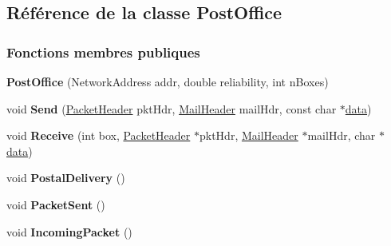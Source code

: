 \hypertarget{class_post_office}{}\subsection{Référence de la classe Post\+Office}
\label{class_post_office}
\subsubsection*{Fonctions membres publiques}
\begin{DoxyCompactItemize}
\item 
\hypertarget{class_post_office_af79d08378025395d9e5fbcb62fc508cb}{}\label{class_post_office_af79d08378025395d9e5fbcb62fc508cb} 
{\bfseries Post\+Office} (Network\+Address addr, double reliability, int n\+Boxes)
\item 
\hypertarget{class_post_office_a06fa263f4cd816e35c8aa78c5168f21f}{}\label{class_post_office_a06fa263f4cd816e35c8aa78c5168f21f} 
void {\bfseries Send} (\hyperlink{class_packet_header}{Packet\+Header} pkt\+Hdr, \hyperlink{class_mail_header}{Mail\+Header} mail\+Hdr, const char $\ast$\hyperlink{structdata}{data})
\item 
\hypertarget{class_post_office_a933ada80e0a7a5f360b80a26134b5f53}{}\label{class_post_office_a933ada80e0a7a5f360b80a26134b5f53} 
void {\bfseries Receive} (int box, \hyperlink{class_packet_header}{Packet\+Header} $\ast$pkt\+Hdr, \hyperlink{class_mail_header}{Mail\+Header} $\ast$mail\+Hdr, char $\ast$\hyperlink{structdata}{data})
\item 
\hypertarget{class_post_office_a67ca2cc25e411b1e83580728d8fcfea8}{}\label{class_post_office_a67ca2cc25e411b1e83580728d8fcfea8} 
void {\bfseries Postal\+Delivery} ()
\item 
\hypertarget{class_post_office_aab32fd95c48b517b274f4e20bf16e775}{}\label{class_post_office_aab32fd95c48b517b274f4e20bf16e775} 
void {\bfseries Packet\+Sent} ()
\item 
\hypertarget{class_post_office_a4f1c8896b71f3ef617e106baf1d08e59}{}\label{class_post_office_a4f1c8896b71f3ef617e106baf1d08e59} 
void {\bfseries Incoming\+Packet} ()
\end{DoxyCompactItemize}
